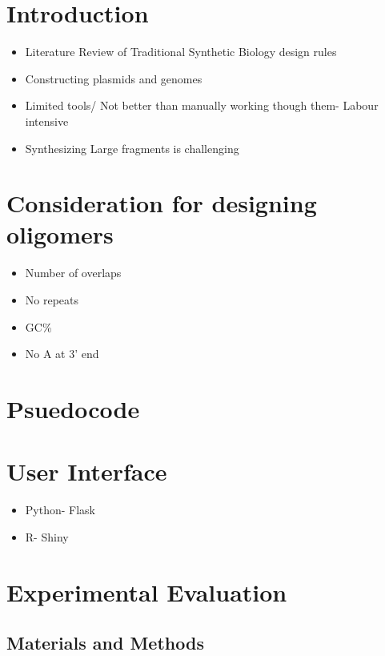 \documentclass[
  letterpaper,
]{book}
\begin{document}
\section{Introduction}\label{introduction-4}

\begin{itemize}
\item
  Literature Review of Traditional Synthetic Biology design rules
\item
  Constructing plasmids and genomes
\item
  Limited tools/ Not better than manually working though them- Labour
  intensive
\item
  Synthesizing Large fragments is challenging
\end{itemize}

\section{Consideration for designing
oligomers}\label{consideration-for-designing-oligomers}

\begin{itemize}
\item
  Number of overlaps
\item
  No repeats
\item
  GC\%
\item
  No A at 3' end
\end{itemize}

\section{Psuedocode}\label{psuedocode}

\section{User Interface}\label{user-interface}

\begin{itemize}
\item
  Python- Flask
\item
  R- Shiny
\end{itemize}

\section{Experimental Evaluation}\label{experimental-evaluation}

\subsection{Materials and Methods}\label{materials-and-methods}
\end{document}
